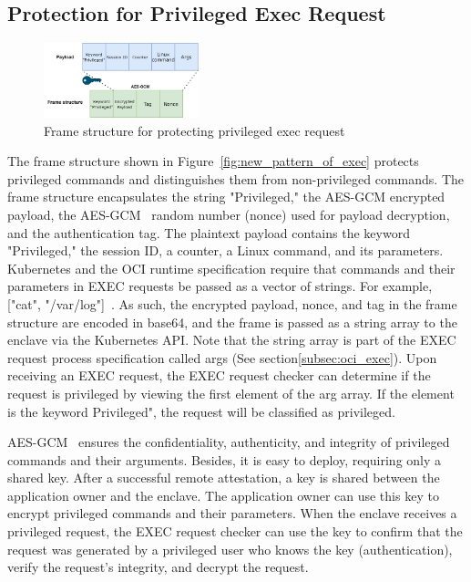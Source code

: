 \subsection{Protection for Privileged Exec Request}
\label{sec:design_prptect_privileged_request}
\begin{figure}[!htb]
    \centering
    \includegraphics[width=0.4\textwidth]{images/exec_frame.png}
    \caption[Frame structure  for protecting privileged exec request]{Frame structure  for protecting privileged exec request}
    \label{fig:exec_frame}
\end{figure}
The frame structure shown in Figure~\ref{fig:new_pattern_of_exec} protects privileged commands and distinguishes them from non-privileged commands. The frame structure encapsulates the string "Privileged," the AES-GCM encrypted payload, the AES-GCM~\cite*{aes_gcm} random number (nonce) used for payload decryption, and the authentication tag. 
The plaintext payload contains the keyword "Privileged," the session ID, a counter,  a Linux command, and its parameters. Kubernetes and the OCI runtime specification require that commands and their parameters in EXEC requests be passed as a vector of strings. For example, ["cat", "/var/log"]~\cite*{k8s}. As such, 
the encrypted payload, nonce, and tag in the frame structure are encoded in base64, and the frame is passed as a string array to the enclave via the Kubernetes API. Note that the string array is part of the EXEC request process specification called args (See section\ref{subsec:oci_exec}). Upon receiving an EXEC request, 
the EXEC request checker can determine if the request is privileged by viewing the first element of the arg array. If the element is the keyword Privileged", the request will be classified as privileged.

AES-GCM~\cite*{aes_gcm} ensures the confidentiality, authenticity, and integrity of privileged commands and their arguments. Besides, it is easy to deploy, requiring only a shared key. After a successful remote attestation, a key is shared between the application owner and the enclave. The application owner can 
use this key to encrypt privileged commands and their parameters. When the enclave receives a privileged request, the EXEC request checker can use the key to confirm that the request was generated by a privileged user who knows the key (authentication), verify the request's integrity, and decrypt the 
request.


